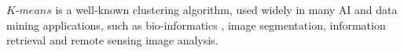 \documentclass[10pt,journal,compsoc]{IEEEtran}
\begin{document}
%
\IEEEpeerreviewmaketitle







% 
% 
% 
% 

$K$-$means$ is a well-known clustering algorithm, used widely in many AI and data mining applications, such as bio-informatics \cite{ben1999clustering, jiang2004cluster}, image segmentation\cite{coleman1979image, jain1988algorithms}, information retrieval \cite{steinbach2000comparison} and remote sensing image analysis\cite{kumar2011parallel}.
\end{document}
